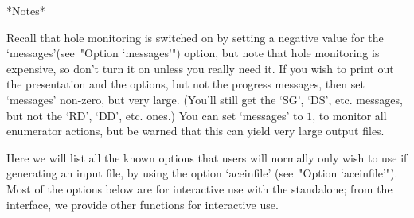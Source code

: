 
*Notes*

Recall that hole monitoring is switched on by setting a negative value
for the `messages'(see~"Option `messages'") option, but note that hole
monitoring is expensive, so don't turn it on unless  you  really  need
it. If you wish to print out the presentation and the options, but not
the progress messages, then set `messages' non-zero, but  very  large.
(You'll still get the `SG', `DS', etc. messages,  but  not  the  `RD',
`DD', etc. ones.) You can  set  `messages'  to  $1$,  to  monitor  all
enumerator actions, but be warned  that  this  can  yield  very  large
output files.


Here we will list  all  the  known  {\ACE}  options  that  users  will
normally only wish to use if generating an input file,  by  using  the
option `aceinfile' (see~"Option  `aceinfile'").  Most of  the  options
below are for interactive use with the  standalone;  from  the  {\GAP}
interface, we provide other functions for interactive use.


